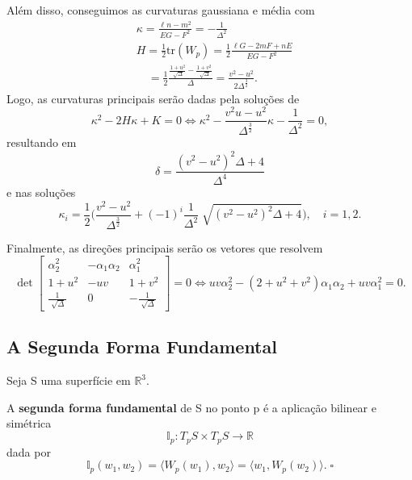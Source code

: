 \documentclass[../differential_geometry.tex]{subfiles}
\begin{document}
\begin{example}
	Além disso, conseguimos as curvaturas gaussiana e média com
	\begin{align*}
		 & \kappa  = \frac{\ell n-m^{2}}{EG-F^2} = -\frac{1}{\Delta^{2}}                                                                                      \\
		 & H = \frac{1}{2}\mathrm{tr}(W_{p}) = \frac{1}{2}\frac{\ell G - 2mF + nE}{EG-F^{2}}                                                                  \\
		 & \quad = \frac{1}{2}\frac{\frac{1+u^{2}}{\sqrt[]{\Delta }}- \frac{1+v^{2}}{\sqrt[]{\Delta }}}{\Delta } = \frac{v^{2}-u^{2}}{2\Delta^{\frac{3}{2}}}.
	\end{align*}
	Logo, as curvaturas principais serão dadas pela soluções de
	\[
		\kappa ^{2} - 2H\kappa  + K  =0 \Longleftrightarrow \kappa ^{2} - \frac{v^{2}u-u^{2}}{\Delta^{\frac{3}{2}}}\kappa -\frac{1}{\Delta^{2}}=0,
	\]
	resultando em
	\[
		\delta = \frac{(v^{2}-u^{2})^{2}\Delta +4}{\Delta^{4}}
	\]
	e nas soluções
	\[
		\kappa_{i} = \frac{1}{2}\biggl(\frac{v^{2}-u^{2}}{\Delta^{\frac{3}{2}}} + (-1)^{i}\frac{1}{\Delta^{2}}\sqrt[]{(v^{2}-u^{2})^{2}\Delta +4}\biggr), \quad i=1, 2.
	\]

	Finalmente, as direções principais serão os vetores que resolvem
	\[
		\det\begin{bmatrix}
			\alpha_{2}^{2}             & -\alpha_1\alpha_2 & \alpha_{1}^{2}               \\
			1+u^{2}                    & -uv               & 1+v^{2}                      \\
			\frac{1}{\sqrt[]{\Delta }} & 0                 & - \frac{1}{\sqrt[]{\Delta }}
		\end{bmatrix} = 0 \Longleftrightarrow uv \alpha_{2}^{2} - (2+u^{2}+v^{2})\alpha_1\alpha_2 + uv\alpha_{1}^{2} = 0.
	\]
\end{example}
\subsection{A Segunda Forma Fundamental}
Seja S uma superfície em \(\mathbb{R}^{3}\).
\begin{def*}
	A \textbf{segunda forma fundamental} de S no ponto p é a aplicação bilinear e simétrica
	\[
		\mathbb{I}_p:T_pS\times T_pS\rightarrow \mathbb{R}
	\]
	dada por
	\[
		\mathbb{I}_p (w_1, w_2) = \langle W_p(w_1), w_2 \rangle = \langle w_1, W_p(w_2) \rangle.\; \square
	\]
\end{def*}
\end{document}
